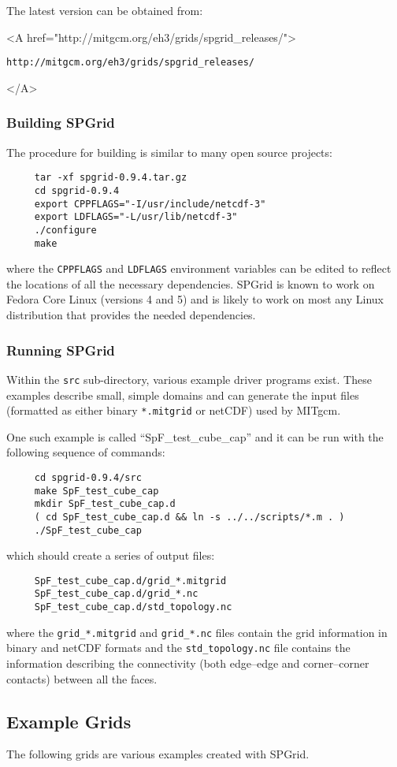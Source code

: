 The latest version can be obtained from:
\begin{center}
  \begin{rawhtml}
     <A href="http://mitgcm.org/eh3/grids/spgrid_releases/">
  \end{rawhtml}
  \texttt{http://mitgcm.org/eh3/grids/spgrid\_releases/}
  \begin{rawhtml} </A> \end{rawhtml}
\end{center}


\subsubsection{Building SPGrid}

The procedure for building is similar to many open source projects:
\begin{verbatim}
     tar -xf spgrid-0.9.4.tar.gz
     cd spgrid-0.9.4
     export CPPFLAGS="-I/usr/include/netcdf-3"
     export LDFLAGS="-L/usr/lib/netcdf-3"
     ./configure
     make
\end{verbatim}
where the \texttt{CPPFLAGS} and \texttt{LDFLAGS} environment variables
can be edited to reflect the locations of all the necessary
dependencies.  SPGrid is known to work on Fedora Core Linux (versions
4 and 5) and is likely to work on most any Linux distribution that
provides the needed dependencies.


\subsubsection{Running SPGrid}

Within the \texttt{src} sub-directory, various example driver programs
exist.  These examples describe small, simple domains and can generate
the input files (formatted as either binary \texttt{*.mitgrid} or
netCDF) used by MITgcm.

One such example is called ``SpF\_test\_cube\_cap'' and it can be run
with the following sequence of commands:
\begin{verbatim}
     cd spgrid-0.9.4/src
     make SpF_test_cube_cap
     mkdir SpF_test_cube_cap.d
     ( cd SpF_test_cube_cap.d && ln -s ../../scripts/*.m . )
     ./SpF_test_cube_cap
\end{verbatim}
which should create a series of output files:
\begin{verbatim}
     SpF_test_cube_cap.d/grid_*.mitgrid
     SpF_test_cube_cap.d/grid_*.nc
     SpF_test_cube_cap.d/std_topology.nc
\end{verbatim}
where the \texttt{grid\_*.mitgrid} and \texttt{grid\_*.nc} files
contain the grid information in binary and netCDF formats and the
\texttt{std\_topology.nc} file contains the information describing the
connectivity (both edge--edge and corner--corner contacts) between all
the faces.


\subsection{Example Grids}

The following grids are various examples created with SPGrid. 
